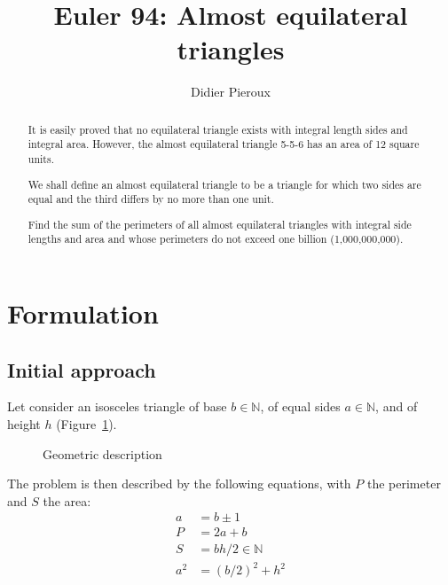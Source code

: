 \documentclass[11pt, twoside, a4paper]{article}
\newcommand{\Figure}[1]{Figure~\ref{#1}}
\newcommand{\Nat}{\mathbb{N}}
\begin{document}
    \title{Euler 94: Almost equilateral triangles}
    \date{}
    \author{Didier Pieroux}
    \maketitle
    
    \begin{abstract}
        It is easily proved that no equilateral triangle exists with integral length sides and integral area. However, the almost equilateral triangle 5-5-6 has an area of 12 square units.
    
        We shall define an almost equilateral triangle to be a triangle for which two sides are equal and the third differs by no more than one unit.
    
        Find the sum of the perimeters of all almost equilateral triangles with integral side lengths and area and whose perimeters do not exceed one billion (1,000,000,000).
    \end{abstract}
    
    \section{Formulation}
    \subsection{Initial approach}
    Let consider an isosceles triangle of base $b\in\Nat$, of equal sides $a\in\Nat$, and of height $h$ (\Figure{fig:triangle1}).
      
    \begin{figure}[h!]
        \begin{center}
            \caption{Geometric description}
            \label{fig:triangle1}
        \end{center}
    \end{figure}

    The problem is then described by the following equations, with $P$ the perimeter and $S$ the area:
    \begin{align}
        a & = b \pm 1 \\ \label{eq:a1}
        P & = 2a+b \\ 
        S & = bh/2 \in \Nat\\
        a^2 & = (b/2)^2 + h^2 \label{eq:pytha1}
    \end{align} 
        
\end{document}
